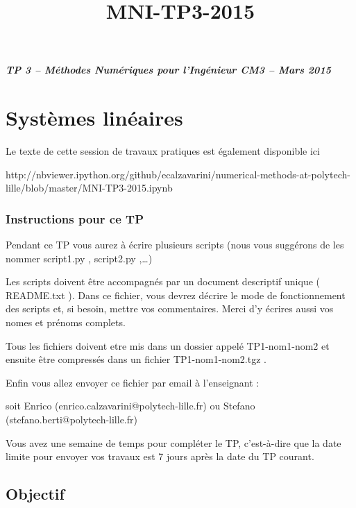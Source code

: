 \documentclass{article}
\title{MNI-TP3-2015}
\begin{document}
    
    
    \maketitle
    
    

    

    \subparagraph{TP 3 -- Méthodes Numériques pour l'Ingénieur CM3 -- Mars 2015}



    \section{Systèmes linéaires}


    Le texte de cette session de travaux pratiques est également disponible
ici

http://nbviewer.ipython.org/github/ecalzavarini/numerical-methods-at-polytech-lille/blob/master/MNI-TP3-2015.ipynb


    \subsubsection{Instructions pour ce TP}


    Pendant ce TP vous aurez à écrire plusieurs scripts (nous vous suggérons
de les nommer script1.py , script2.py ,\ldots{})

    Les scripts doivent être accompagnés par un document descriptif unique (
README.txt ). Dans ce fichier, vous devrez décrire le mode de
fonctionnement des scripts et, si besoin, mettre vos commentaires. Merci
d'y écrires aussi vos nomes et prénoms complets.

    Tous les fichiers doivent etre mis dans un dossier appelé TP1-nom1-nom2
et ensuite être compressés dans un fichier TP1-nom1-nom2.tgz .

    Enfin vous allez envoyer ce fichier par email à l'enseignant :

soit Enrico (enrico.calzavarini@polytech-lille.fr) ou Stefano
(stefano.berti@polytech-lille.fr)

    Vous avez une semaine de temps pour compléter le TP, c'est-à-dire que la
date limite pour envoyer vos travaux est 7 jours après la date du TP
courant.


    \subsection{Objectif}
\end{document}
